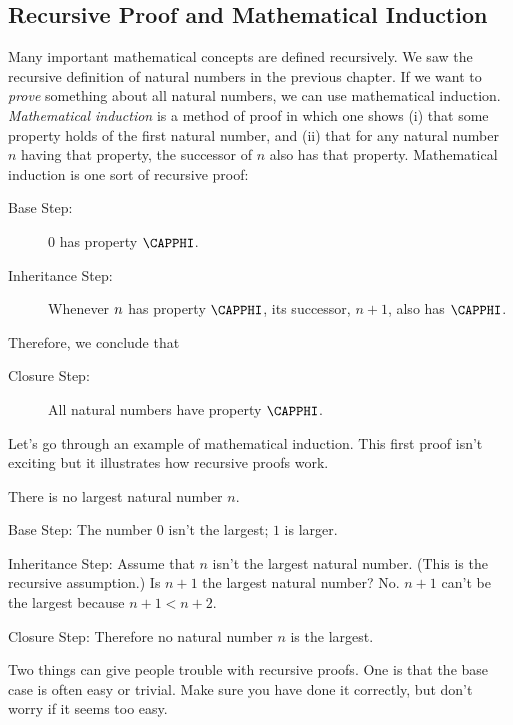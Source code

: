 \subsection{Recursive Proof and Mathematical Induction}
Many important mathematical concepts are defined recursively. 
We saw the recursive definition of natural numbers in the previous chapter. 
If we want to \emph{prove} something about all natural numbers, we can use mathematical induction.
\emph{Mathematical induction} is a method of proof in which one shows (i) that some property holds of the first natural number, and (ii) that for any natural number $n$ having that property, the successor of $n$ also has that property.
Mathematical induction is one sort of recursive proof:
\begin{description}
	\item[Base Step:] $0$ has property $\CAPPHI$. 
	\item[Inheritance Step:] Whenever $n$ has property $\CAPPHI$, its successor, $n+1$, also has $\CAPPHI$.
\end{description}
Therefore, we conclude that
\begin{description}
	\item[Closure Step:] All natural numbers have property $\CAPPHI$.
\end{description}

Let's go through an example of mathematical induction.
This first proof isn't exciting but it illustrates how recursive proofs work.

\begin{majorILnc}{} 
	There is no largest natural number $n$. 
	
	\begin{PROOF}	\begin{cenumerate}
			\item Base Step: The number $0$ isn't the largest; $1$ is larger.
			\item Inheritance Step: Assume that $n$ isn't the largest natural number. (This is the recursive assumption.)
			Is $n+1$ the largest natural number? No. $n+1$ can't be the largest because $n+1<n+2$.  
			\item Closure Step: Therefore no natural number $n$ is the largest.
	\end{cenumerate}
\end{PROOF}
\end{majorILnc}

\noindent{}Two things can give people trouble with recursive proofs.
One is that the base case is often easy or trivial. 
Make sure you have done it correctly, but don't worry if it seems too easy. 

